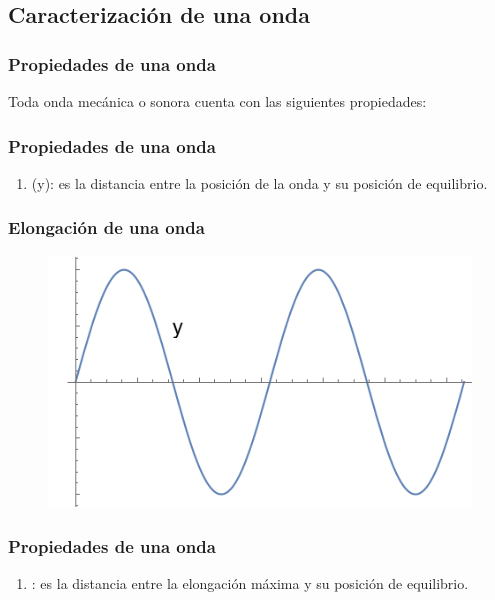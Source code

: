\documentclass[14pt]{beamer}
\begin{document}
\subsection{Caracterización de una onda}

\begin{frame}
\frametitle{Propiedades de una onda}
Toda onda mecánica o sonora cuenta con las siguientes propiedades:
\end{frame}
\begin{frame}
\frametitle{Propiedades de una onda}
\begin{enumerate}[<+->]
\item {} (y): es la distancia entre la posición de la onda y su posición de equilibrio.
\seti
\end{enumerate}
\end{frame}
\begin{frame}
\frametitle{Elongación de una onda}
\begin{figure}
    \centering
    \includegraphics[scale=0.8]{Imagenes/Plot_Onda_02.png}
\end{figure}
\end{frame}
\begin{frame}
\frametitle{Propiedades de una onda}
\begin{enumerate}[<+->]
\conti
\item {}: es la distancia entre la elongación máxima y su posición de equilibrio.
\seti
\end{enumerate}
\end{frame}
\end{document}
